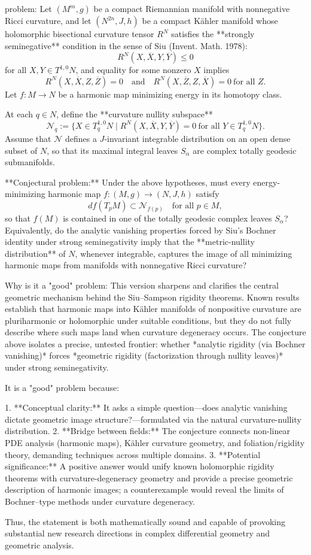 problem:  
Let \( (M^m,g) \) be a compact Riemannian manifold with nonnegative Ricci curvature, and let \( (N^{2n},J,h) \) be a compact Kähler manifold whose holomorphic bisectional curvature tensor \( R^N \) satisfies the **strongly seminegative** condition in the sense of Siu (Invent. Math. 1978):  
\[
R^N(X,\overline{X},Y,\overline{Y}) \le 0
\]
for all \( X,Y \in T^{1,0}N \), and equality for some nonzero \( X \) implies  
\[
R^N(X,\overline{X},Z,\overline{Z}) = 0
\quad \text{and} \quad
R^N(X,\overline{Z},Z,\overline{X})=0
\ \text{for all } Z .
\]  
Let \( f:M \to N \) be a harmonic map minimizing energy in its homotopy class.  

At each \( q \in N \), define the **curvature nullity subspace**
\[
\mathcal{N}_q := \{ X \in T^{1,0}_q N \mid R^N(X,\overline{X},Y,\overline{Y})=0 \ \text{for all } Y \in T^{1,0}_q N \}.
\]
Assume that \(\mathcal{N}\) defines a \(J\)-invariant integrable distribution on an open dense subset of \(N\), so that its maximal integral leaves \(S_\alpha\) are complex totally geodesic submanifolds.

**Conjectural problem:**  
Under the above hypotheses, must every energy-minimizing harmonic map \(f:(M,g)\to(N,J,h)\) satisfy  
\[
df(T_p M) \subset \mathcal{N}_{f(p)} \quad \text{for all } p\in M,
\]
so that \(f(M)\) is contained in one of the totally geodesic complex leaves \(S_\alpha\)?  
Equivalently, do the analytic vanishing properties forced by Siu’s Bochner identity under strong seminegativity imply that the **metric-nullity distribution** of \(N\), whenever integrable, captures the image of all minimizing harmonic maps from manifolds with nonnegative Ricci curvature?

Why is it a "good" problem:  
This version sharpens and clarifies the central geometric mechanism behind the Siu–Sampson rigidity theorems. Known results establish that harmonic maps into Kähler manifolds of nonpositive curvature are pluriharmonic or holomorphic under suitable conditions, but they do not fully describe where such maps land when curvature degeneracy occurs. The conjecture above isolates a precise, untested frontier: whether *analytic rigidity (via Bochner vanishing)* forces *geometric rigidity (factorization through nullity leaves)* under strong seminegativity.  

It is a "good" problem because:  

1. **Conceptual clarity:** It asks a simple question—does analytic vanishing dictate geometric image structure?—formulated via the natural curvature-nullity distribution.  
2. **Bridge between fields:** The conjecture connects non-linear PDE analysis (harmonic maps), Kähler curvature geometry, and foliation/rigidity theory, demanding techniques across multiple domains.  
3. **Potential significance:** A positive answer would unify known holomorphic rigidity theorems with curvature-degeneracy geometry and provide a precise geometric description of harmonic images; a counterexample would reveal the limits of Bochner–type methods under curvature degeneracy.  

Thus, the statement is both mathematically sound and capable of provoking substantial new research directions in complex differential geometry and geometric analysis.